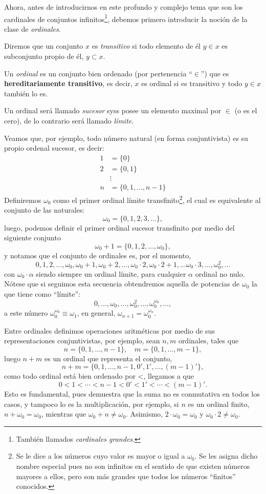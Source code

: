 \documentclass[11pt,oneside,a4paper]{book}
\begin{document}
Ahora, antes de introducirnos en este profundo y complejo tema que son los cardinales de conjuntos infinitos\footnote{También llamados \textit{cardinales grandes}.}, debemos primero introducir la noción de la clase de \textit{ordinales}.
\begin{mydef}
Diremos que un conjunto $x$ es \textit{transitivo} si todo elemento de él $y\in x$ es subconjunto propio de él, $y\subset x$.

Un \textit{ordinal} es un conjunto bien ordenado (por pertenencia ``$\in$'') que es \textbf{hereditariamente transitivo}, es decir, $x$ es ordinal si es transitivo y todo $y\in x$ también lo es.

Un ordinal será llamado \textit{sucesor} syss posee un elemento maximal por $\in$ (o es el cero), de lo contrario será llamado \textit{límite}.
\end{mydef}
Veamos que, por ejemplo, todo número natural (en forma conjuntivista) es su propio ordenal sucesor, es decir:
\begin{align*}
1&=\{0\}\\
2&=\{0,1\}\\
&\vdots\\
n&=\{0,1,\dots,n-1\}
\end{align*}
Definiremos $\omega_0$ como el primer ordinal límite transfinito\footnote{Se le dice a los números cuyo valor es mayor o igual a $\omega_0$. Se les asigna dicho nombre especial pues no son infinitos en el sentido de que existen números mayores a ellos, pero son más grandes que todos los números ``finitos'' conocidos.}, el cual es equivalente al conjunto de las naturales:
$$\omega_0=\{0,1,2,3,\dots\},$$
luego, podemos definir el primer ordinal sucesor transfinito por medio del siguiente conjunto
$$\omega_0+1=\{0,1,2,\dots,\omega_0\},$$
y notamos que el conjunto de ordinales es, por el momento,
$$0,1,2,\dots,\omega_0,\omega_0+1,\omega_0+2,\dots,\omega_0\cdot 2,\omega_0\cdot 2+1,\dots\omega_0\cdot 3,\dots,\omega_0^2,\dots$$
con $\omega_0\cdot\alpha$ siendo siempre un ordinal límite, para cualquier $\alpha$ ordinal no nulo. Nótese que si seguimos esta secuencia obtendremos aquella de potencias de $\omega_0$ la que tiene como ``límite'':
$$0,\dots,\omega_0,\dots,\omega_0^2,\dots,\omega_0^{\omega_0},\dots,$$
a este número $\omega_0^{\omega_0}\equiv\omega_1$, en general, $\omega_{n+1}=\omega_0^{\omega_n}$.

Entre ordinales definimos operaciones aritméticas por medio de sus representaciones conjuntivistas, por ejemplo, sean $n,m$ ordinales, tales que
$$n=\{0,1,\dots,n-1\},\quad m=\{0,1,\dots,m-1\},$$
luego $n+m$ es un ordinal que representa el conjunto,
$$n+m=\{0,1,\dots,n-1,0',1',\dots,(m-1)'\},$$
como todo ordinal está bien ordenado por <, llegamos a que
$$0<1<\cdots<n-1<0'<1'<\cdots<(m-1)'.$$
Esto es fundamental, pues demuestra que la suma no es conmutativa en todos los casos, y tampoco lo es la multiplicación, por ejemplo, si $n$ es un ordinal finito, $n+\omega_0=\omega_0$, mientras que $\omega_0+n\neq\omega_0$. Asimismo, $2\cdot\omega_0=\omega_0$ y $\omega_0\cdot 2\neq\omega_0$.
\end{document}
